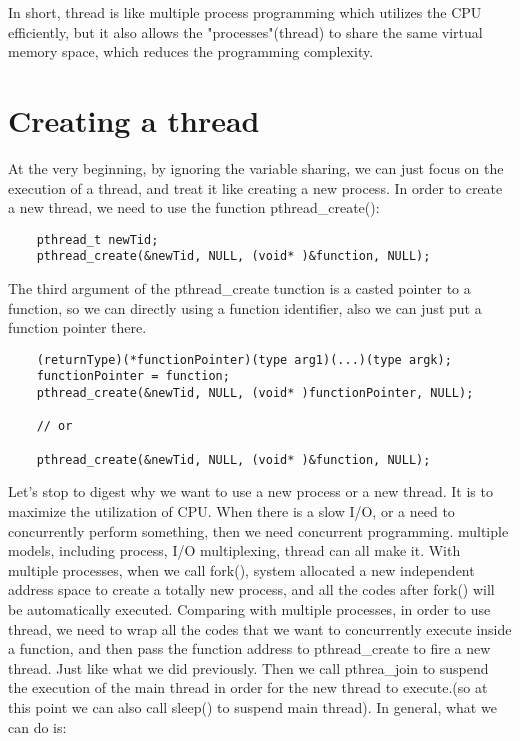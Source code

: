 \documentclass{article}
\begin{document}
\begin{CJK}{UTF8}{gbsn}
    In short, thread is like multiple process programming which utilizes the CPU efficiently, but it also allows the "processes"(thread) to share the same virtual memory space, which reduces the programming complexity.

\section*{Creating a thread}

    At the very beginning, by ignoring the variable sharing, we can just focus on the execution of a thread, and treat it like creating a new process. In order to create a new thread, we need to use the function pthread\_create():

\begin{verbatim}
    pthread_t newTid;
    pthread_create(&newTid, NULL, (void* )&function, NULL);
\end{verbatim}

    The third argument of the pthread\_create tunction is a casted pointer to a function, so we can directly using a function identifier, also we can just put a function pointer there.

\begin{verbatim}
    (returnType)(*functionPointer)(type arg1)(...)(type argk);
    functionPointer = function;
    pthread_create(&newTid, NULL, (void* )functionPointer, NULL);

    // or

    pthread_create(&newTid, NULL, (void* )&function, NULL);
\end{verbatim}

    Let's stop to digest why we want to use a new process or a new thread. It is to maximize the utilization of CPU. When there is a slow I/O, or a need to concurrently perform something, then we need concurrent programming. multiple models, including process, I/O multiplexing, thread can all make it. With multiple processes, when we call fork(), system allocated a new independent address space to create a totally new process, and all the codes after fork() will be automatically executed. Comparing with multiple processes, in order to use thread, we need to wrap all the codes that we want to concurrently execute inside a function, and then pass the function address to pthread\_create to fire a new thread. Just like what we did previously. Then we call pthrea\_join to suspend the execution of the main thread in order for the new thread to execute.(so at this point we can also call sleep() to suspend main thread). In general, what we can do is:


\end{CJK}
\end{document}
